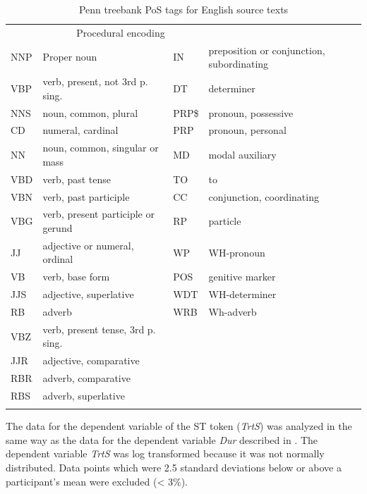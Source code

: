 \documentclass[output=paper]{LSP/langsci}
\begin{document}
\begin{table}
\begin{tabularx}{\textwidth}{l X l X}
\lsptoprule
\multicolumn{2}{c}{Conceptual encoding} & \multicolumn{2}{c}{Procedural encoding}			\\
\cmidrule(lr){1-2} 						  \cmidrule(lr){3-4}
NNP & Proper noun 						& IN 	& preposition or conjunction, subordinating	\\
VBP & verb, present, not 3rd p. sing. 	& DT 	& determiner								\\
NNS & noun, common, plural 				& PRP\$ & pronoun, possessive						\\
CD 	& numeral, cardinal 				& PRP 	& pronoun, personal							\\
NN 	& noun, common, singular or mass 	& MD 	& modal auxiliary							\\
VBD & verb, past tense 					& TO 	& to										\\
VBN & verb, past participle 			& CC 	& conjunction, coordinating					\\
VBG & verb, present participle or gerund& RP 	& particle									\\
JJ 	& adjective or numeral, ordinal 	& WP 	& WH-pronoun								\\
VB 	& verb, base form 					& POS 	& genitive marker							\\
JJS & adjective, superlative 			& WDT 	& WH-determiner								\\
RB 	& adverb 							& WRB 	& Wh-adverb									\\
VBZ & verb, present tense, 3rd p. sing. & ~ 	& ~ 										\\
JJR & adjective, comparative 			& ~ 	& ~ 										\\
RBR & adverb, comparative 				& ~ 	& ~ 										\\
RBS & adverb, superlative 				& ~ 	& ~ 										\\
\lspbottomrule
\end{tabularx}
\caption{Penn treebank PoS tags for English source texts}
\label{carl-schaeffer:tab:postags}
\end{table}

The data for the dependent variable  of the ST token (\textit{TrtS}) was analyzed in the same way as the data for the dependent variable \textit{Dur} described in . The dependent variable \textit{TrtS} was log transformed because it was not normally distributed. Data points which were 2.5 standard deviations below or above a participant's mean were excluded ({\textless} 3\%).
\end{document}

